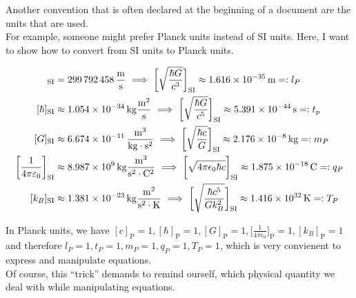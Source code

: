 \noindent Another convention that is often declared at the beginning of a document are the units that are used. \\
For example, someone might prefer Planck units instead of SI units. 
Here, I want to show how to convert from SI units to Planck units.

\begin{align*}
    [ c ]_{\text{SI}} &= \SI{299 792 458}{\frac{\meter}{\second}} \ \Longrightarrow \ \biggl[ \sqrt{\frac{\hbar G}{c^3}} \biggr]_{\text{SI}} \approx \SI{1.616e-35}{\meter} =: l_{P} \\
    [ \hbar ]_{\text{SI}} &\approx \SI{1.054e-34}{\kilogram \frac{\meter^2}{\second}} \ \Longrightarrow \ \biggl[ \sqrt{\frac{\hbar G}{c^5}} \biggr]_{\text{SI}} \approx \SI{5.391e-44}{\second} =: t_{p} \\
    [ G ]_{\text{SI}} &\approx \SI{6.674e-11}{\frac{\meter^3}{\kilogram \cdot \second^2}} \ \Longrightarrow \ \biggl[ \sqrt{\frac{\hbar c}{G}} \biggr]_{\text{SI}} \approx \SI{2.176e-8}{\kilogram} =: m_{P} \\
    \biggl[ \frac{1}{4 \pi \varepsilon_{0}} \biggr]_{\text{SI}} &\approx \SI{8.987e+9}{\kilogram \frac{\meter^3}{\second^2 \cdot \coulomb^2}} \ \Longrightarrow \ \biggl[\sqrt{4 \pi \epsilon_{0} \hbar c} \biggr]_{\text{SI}} \approx \SI{1.875e-18}{\coulomb} =: q_{P} \\
    [ k_{B} ]_{\text{SI}} &\approx \SI{1.381e-23}{\kilogram \frac{\meter^2}{\second^2 \cdot \kelvin}} \ \Longrightarrow \ \biggl[ \sqrt{\frac{\hbar c^5}{G k_{B}^2}} \biggr]_{\text{SI}} \approx \SI{1.416e+32}{\kelvin} =: T_{P}
\end{align*}

\noindent In Planck units, we have $[c]_{\text{P}} = 1, [\hbar]_{\text{P}} = 1, [G]_{\text{P}} = 1, \bigl[ \frac{1}{4 \pi \epsilon_{0}} \bigr]_{\text{P}} = 1, [k_{B}]_{\text{P}} = 1$ and therefore $l_{P} = 1, t_{P} = 1, m_{P} = 1, q_{P} = 1, T_{P} = 1$, which is very convienent to express and manipulate equations. \\
Of course, this ``trick'' demands to remind ourself, which physical quantity we deal with while manipulating equations.





